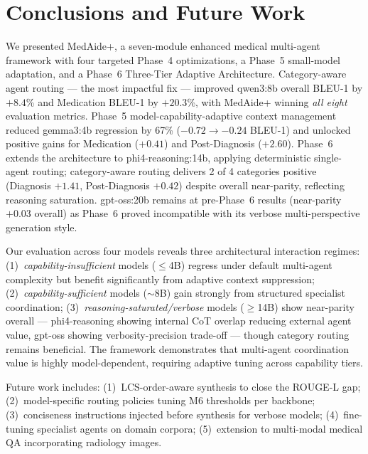 \documentclass[conference]{IEEEtran}
\begin{document}
\section{Conclusions and Future Work}
\label{sec:conclusion}

We presented MedAide+, a seven-module enhanced medical multi-agent framework with four targeted Phase~4 optimizations, a Phase~5 small-model adaptation, and a Phase~6 Three-Tier Adaptive Architecture. Category-aware agent routing — the most impactful fix — improved qwen3:8b overall BLEU-1 by $+8.4$\% and Medication BLEU-1 by $+20.3$\%, with MedAide+ winning \emph{all eight} evaluation metrics. Phase~5 model-capability-adaptive context management reduced gemma3:4b regression by 67\% ($-0.72 \rightarrow -0.24$ BLEU-1) and unlocked positive gains for Medication ($+0.41$) and Post-Diagnosis ($+2.60$). Phase~6 extends the architecture to phi4-reasoning:14b, applying deterministic single-agent routing; category-aware routing delivers 2 of 4 categories positive (Diagnosis $+1.41$, Post-Diagnosis $+0.42$) despite overall near-parity, reflecting reasoning saturation. gpt-oss:20b remains at pre-Phase~6 results (near-parity $+0.03$ overall) as Phase~6 proved incompatible with its verbose multi-perspective generation style.

Our evaluation across four models reveals three architectural interaction regimes: (1)~\textit{capability-insufficient} models ($\leq$4B) regress under default multi-agent complexity but benefit significantly from adaptive context suppression; (2)~\textit{capability-sufficient} models ($\sim$8B) gain strongly from structured specialist coordination; (3)~\textit{reasoning-saturated/verbose} models ($\geq$14B) show near-parity overall — phi4-reasoning showing internal CoT overlap reducing external agent value, gpt-oss showing verbosity-precision trade-off — though category routing remains beneficial. The framework demonstrates that multi-agent coordination value is highly model-dependent, requiring adaptive tuning across capability tiers.

Future work includes: (1)~LCS-order-aware synthesis to close the ROUGE-L gap; (2)~model-specific routing policies tuning M6 thresholds per backbone; (3)~conciseness instructions injected before synthesis for verbose models; (4)~fine-tuning specialist agents on domain corpora; (5)~extension to multi-modal medical QA incorporating radiology images.
\end{document}
